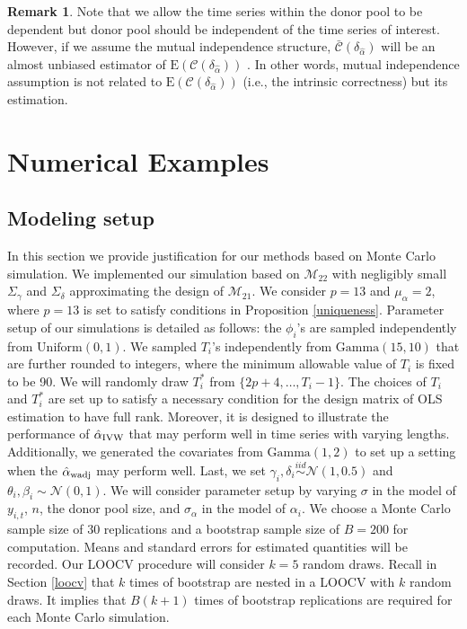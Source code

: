 \documentclass[11pt]{article}
\newcommand{\simiid}{\stackrel{iid}{\sim}} %
\def\mrm#1{\mathrm{#1}} %
\def\normal#1#2{\mathcal{N}(#1,#2)} %
\def\mc#1{\mathcal{#1}} %
\def\E#1{\mathrm{E}(#1)} %
\theoremstyle{definition}
\newtheorem{remark}{Remark}
\begin{document}
\begin{remark}
  Note that we allow the time series within the donor pool to be dependent but donor pool should be independent of the time series of interest. However, if we assume the mutual  independence structure, $\bar{\mc{C}}(\delta_{\hat{\alpha}})$ will be an almost unbiased estimator of $\E{\mc{C}(\delta_{\hat{\alpha}})}$ \citep[Page 222]{msos}. In other words, mutual independence assumption is not related to  $\E{\mc{C}(\delta_{\hat{\alpha}})}$ (i.e., the intrinsic correctness) but its estimation. 
\end{remark}



\section{Numerical Examples}
\label{simulation}

\subsection{Modeling setup}

In this section we provide justification for our methods based on Monte Carlo simulation. We implemented our simulation based on $\mc{M}_{22}$ with negligibly small $\Sigma_{\gamma}$ and $\Sigma_{\delta}$ approximating the design of $\mathcal{M}_{21}$.  We consider $p=13$ and $\mu_{\alpha}=2$, where $p = 13$ is set to satisfy conditions in Proposition \ref{uniqueness}. Parameter setup of our simulations is detailed as follows: the $\phi_i$'s are sampled independently from $\mrm{Uniform}(0,1)$. We sampled $T_i$'s independently from  $\text{Gamma}(15, 10)$ that are further rounded to integers, where the minimum allowable value of $T_i$ is fixed to be 90. We will randomly draw $T_i^*$ from $\{2p + 4, \ldots, T_i-1\}$. The choices of $T_i$ and $T_i^*$ are set up to satisfy a necessary condition for the design matrix of OLS estimation to have full rank. Moreover, it is  designed to illustrate the performance of $\hat{\alpha}_{\rm IVW}$ that may perform well in time series with varying lengths. Additionally, we generated the covariates from $\text{Gamma}(1,2)$ to set up a setting when the $\hat{\alpha}_{\rm wadj}$ may perform well. Last, we set $\gamma_i, \delta_i\simiid  \normal{1}{0.5}$ and $\theta_i, \beta_i \sim \normal{0}{1}$. We will consider parameter setup by varying $\sigma$ in the model of $y_{i,t}$, $n$, the donor pool size, and $\sigma_{\alpha}$ in the model of $\alpha_i$. We choose a Monte Carlo sample size of $30$ replications and a bootstrap sample size of $B = 200$ for computation. Means and standard errors for estimated quantities will be recorded. Our LOOCV procedure will consider $k=5$ random draws. Recall in Section \ref{loocv} that $k$ times of bootstrap are nested in a LOOCV with $k$ random draws. It implies that $B(k+1)$ times of bootstrap replications are required for each Monte Carlo simulation.
\end{document}
